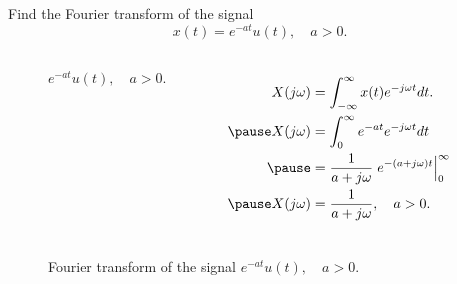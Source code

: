 \begin{frame}
    \begin{example}
        Find the Fourier transform of the signal
        \begin{equation*}
            x(t) = e^{-at}u(t), \quad a> 0.
        \end{equation*}
    \end{example}
    \pause
    {
        \begin{columns}
                {
                    \begin{figure}
                      \centering
                      
                      \caption{$e^{-at}u(t), \quad a> 0$.}\label{fi:eatut_signal}
                    \end{figure}
                }
                \begin{equation*}
                    \begin{aligned}
                        X(j\omega) &= \int_{-\infty}^{\infty}x(t)e^{-j\omega t} dt.\\ \pause
                        X(j\omega) &= \int_{0}^{\infty} e^{-at}e^{-j\omega t}dt\\ \pause
                        &= \frac{1}{a+j\omega}\left. e^{-(a+j\omega)t}\right|_{0}^{\infty}\\ \pause
                        X(j\omega) &= \frac{1}{a+j\omega}, \quad a>0.
                    \end{aligned}
                \end{equation*}
        \end{columns}
    }
\end{frame}

\begin{frame}[plain]
    {
        \begin{figure}
          \centering
          
          \caption{Fourier transform of the signal $e^{-at}u(t), \quad a> 0$.}\label{fi:eatut}
        \end{figure}
    }
\end{frame}

